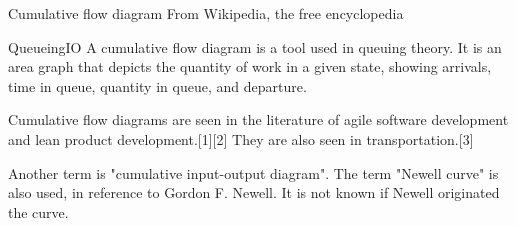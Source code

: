 
Cumulative flow diagram
From Wikipedia, the free encyclopedia

QueueingIO
A cumulative flow diagram is a tool used in queuing theory. It is an area graph that depicts the quantity of work in a given state, showing arrivals, time in queue, quantity in queue, and departure.

Cumulative flow diagrams are seen in the literature of agile software development and lean product development.[1][2] They are also seen in transportation.[3]

Another term is "cumulative input-output diagram". The term "Newell curve" is also used, in reference to Gordon F. Newell. It is not known if Newell originated the curve.

